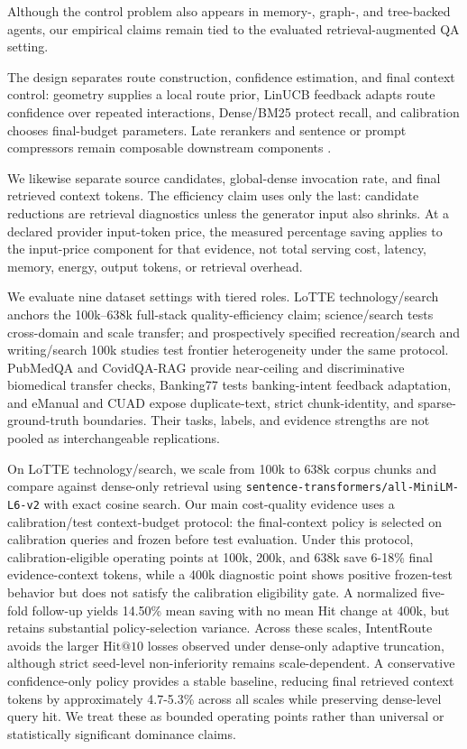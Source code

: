 Although the control problem also appears in memory-, graph-, and tree-backed agents, our empirical claims remain tied to the evaluated retrieval-augmented QA setting.

The design separates route construction, confidence estimation, and final context control: geometry supplies a local route prior, LinUCB feedback adapts route confidence over repeated interactions, Dense/BM25 protect recall, and calibration chooses final-budget parameters. Late rerankers and sentence or prompt compressors remain composable downstream components \citep{hwang2024dslr,pan2024llmlingua2}.

We likewise separate source candidates, global-dense invocation rate, and final retrieved context tokens. The efficiency claim uses only the last: candidate reductions are retrieval diagnostics unless the generator input also shrinks. At a declared provider input-token price, the measured percentage saving applies to the input-price component for that evidence, not total serving cost, latency, memory, energy, output tokens, or retrieval overhead.

We evaluate nine dataset settings with tiered roles. LoTTE technology/search anchors the 100k--638k full-stack quality-efficiency claim; science/search tests cross-domain and scale transfer; and prospectively specified recreation/search and writing/search 100k studies test frontier heterogeneity under the same protocol. PubMedQA and CovidQA-RAG provide near-ceiling and discriminative biomedical transfer checks, Banking77 tests banking-intent feedback adaptation, and eManual and CUAD expose duplicate-text, strict chunk-identity, and sparse-ground-truth boundaries. Their tasks, labels, and evidence strengths are not pooled as interchangeable replications.

On LoTTE technology/search, we scale from 100k to 638k corpus chunks and compare against dense-only retrieval using \nolinkurl{sentence-transformers/all-MiniLM-L6-v2} with exact cosine search. Our main cost-quality evidence uses a calibration/test context-budget protocol: the final-context policy is selected on calibration queries and frozen before test evaluation. Under this protocol, calibration-eligible operating points at 100k, 200k, and 638k save 6-18\% final evidence-context tokens, while a 400k diagnostic point shows positive frozen-test behavior but does not satisfy the calibration eligibility gate. A normalized five-fold follow-up yields 14.50\% mean saving with no mean Hit change at 400k, but retains substantial policy-selection variance. Across these scales, IntentRoute avoids the larger $\mathrm{Hit@10}$ losses observed under dense-only adaptive truncation, although strict seed-level non-inferiority remains scale-dependent. A conservative confidence-only policy provides a stable baseline, reducing final retrieved context tokens by approximately 4.7-5.3\% across all scales while preserving dense-level query hit. We treat these as bounded operating points rather than universal or statistically significant dominance claims.

